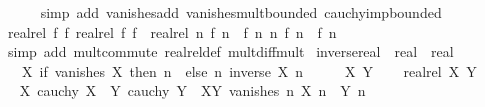 \begin{isabellebody}
\ \ \ \ \isamarkupfalse%
\ {\isacharparenleft}{\kern0pt}simp\ add{\isacharcolon}{\kern0pt}\ vanishes{\isacharunderscore}{\kern0pt}add\ vanishes{\isacharunderscore}{\kern0pt}mult{\isacharunderscore}{\kern0pt}bounded\ cauchy{\isacharunderscore}{\kern0pt}imp{\isacharunderscore}{\kern0pt}bounded{\isacharparenright}{\kern0pt}\isanewline
\ \ \isamarkupfalse%
\ \isamarkupfalse%
\ {\isachardoublequoteopen}{\isasymlbrakk}realrel\ f{}\ f{}{\isacharsemicolon}{\kern0pt}\ realrel\ f{}\ f{}{\isasymrbrakk}\ {\isasymLongrightarrow}\ realrel\ {\isacharparenleft}{\kern0pt}{\isasymlambda}n{\isachardot}{\kern0pt}\ f{}\ n\ {\isacharasterisk}{\kern0pt}\ f{}\ n{\isacharparenright}{\kern0pt}\ {\isacharparenleft}{\kern0pt}{\isasymlambda}n{\isachardot}{\kern0pt}\ f{}\ n\ {\isacharasterisk}{\kern0pt}\ f{}\ n{\isacharparenright}{\kern0pt}{\isachardoublequoteclose}\isanewline
\ \ \ \ \isamarkupfalse%
\ {\isacharparenleft}{\kern0pt}simp\ add{\isacharcolon}{\kern0pt}\ mult{\isachardot}{\kern0pt}commute\ realrel{\isacharunderscore}{\kern0pt}def\ mult{\isacharunderscore}{\kern0pt}diff{\isacharunderscore}{\kern0pt}mult{\isacharparenright}{\kern0pt}\isanewline
{}\isamarkupfalse%
%
\endisatagproof
{\isafoldproof}%
%
\isadelimproof
\isanewline
%
\endisadelimproof
\isanewline
{}\isamarkupfalse%
\ inverse{\isacharunderscore}{\kern0pt}real\ {\isacharcolon}{\kern0pt}{\isacharcolon}{\kern0pt}\ {\isachardoublequoteopen}real\ {\isasymRightarrow}\ real{\isachardoublequoteclose}\isanewline
\ \ \ {\isachardoublequoteopen}{\isasymlambda}X{\isachardot}{\kern0pt}\ if\ vanishes\ X\ then\ {\isacharparenleft}{\kern0pt}{\isasymlambda}n{\isachardot}{\kern0pt}\ {}{\isacharparenright}{\kern0pt}\ else\ {\isacharparenleft}{\kern0pt}{\isasymlambda}n{\isachardot}{\kern0pt}\ inverse\ {\isacharparenleft}{\kern0pt}X\ n{\isacharparenright}{\kern0pt}{\isacharparenright}{\kern0pt}{\isachardoublequoteclose}\isanewline
%
\isadelimproof
%
\endisadelimproof
%
\isatagproof
{}\isamarkupfalse%
\ {\isacharminus}{\kern0pt}\isanewline
\ \ \isamarkupfalse%
\ X\ Y\isanewline
\ \ \isamarkupfalse%
\ {\isachardoublequoteopen}realrel\ X\ Y{\isachardoublequoteclose}\isanewline
\ \ \isamarkupfalse%
\ \isamarkupfalse%
\ X{\isacharcolon}{\kern0pt}\ {\isachardoublequoteopen}cauchy\ X{\isachardoublequoteclose}\ \ Y{\isacharcolon}{\kern0pt}\ {\isachardoublequoteopen}cauchy\ Y{\isachardoublequoteclose}\ \ XY{\isacharcolon}{\kern0pt}\ {\isachardoublequoteopen}vanishes\ {\isacharparenleft}{\kern0pt}{\isasymlambda}n{\isachardot}{\kern0pt}\ X\ n\ {\isacharminus}{\kern0pt}\ Y\ n{\isacharparenright}{\kern0pt}{\isachardoublequoteclose}\isanewline

\end{isabellebody}
